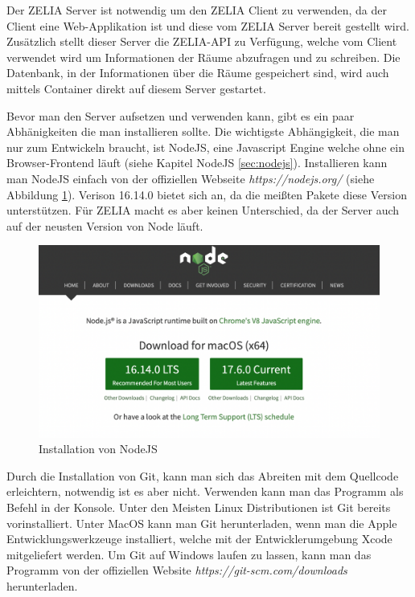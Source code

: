 
Der ZELIA Server ist notwendig um den ZELIA Client zu verwenden, da der Client eine Web-Applikation ist und diese vom ZELIA Server bereit gestellt wird. Zusätzlich stellt dieser Server die ZELIA-API zu Verfügung, welche vom Client verwendet wird um Informationen der Räume abzufragen und zu schreiben. Die Datenbank, in der Informationen über die Räume gespeichert sind, wird auch mittels Container direkt auf diesem Server gestartet.



Bevor man den Server aufsetzen und verwenden kann, gibt es ein paar Abhänigkeiten die man installieren sollte. Die wichtigste Abhängigkeit, die man nur zum Entwickeln braucht, ist NodeJS, eine Javascript Engine welche ohne ein Browser-Frontend läuft (siehe Kapitel NodeJS \ref{sec:nodejs}). Installieren kann man NodeJS einfach von der offiziellen Webseite \emph{https://nodejs.org/} (siehe Abbildung \ref{fig:nodejsdownload}). Verison 16.14.0 bietet sich an, da die meißten Pakete diese Version unterstützen. Für ZELIA macht es aber keinen Unterschied, da der Server auch auf der neusten Version von Node läuft.

\begin{figure}[H]
    \centering
    \includegraphics[width=120mm]{media/Handbuch/nodejs.png}
    \caption{Installation von NodeJS}
    \label{fig:nodejsdownload}
\end{figure}


Durch die Installation von Git, kann man sich das Abreiten mit dem Quellcode erleichtern, notwendig ist es aber nicht. Verwenden kann man das Programm als Befehl in der Konsole. Unter den Meisten Linux Distributionen ist Git bereits vorinstalliert. Unter MacOS kann man Git herunterladen, wenn man die Apple Entwicklungswerkzeuge installiert, welche mit der Entwicklerumgebung Xcode mitgeliefert werden. Um Git auf Windows laufen zu lassen, kann man das Programm von der offiziellen Website \emph{https://git-scm.com/downloads} herunterladen.

